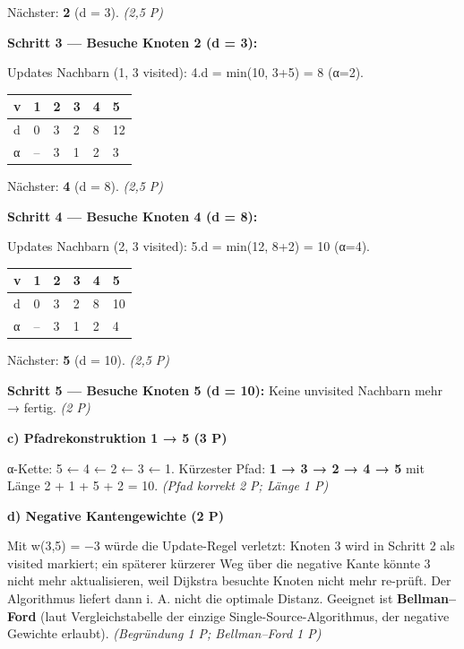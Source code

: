 \documentclass[11pt, a4paper]{article}
\begin{document}
Nächster: \textbf{2} (d = 3). \textit{(2,5 P)}


\textbf{Schritt 3 — Besuche Knoten 2 (d = 3):}

Updates Nachbarn (1, 3 visited): 4.d = min(10, 3+5) = 8 (α=2).



{\small
\begin{tabularx}{\linewidth}{XXXXXX}
\hline
\rowcolor{tableheadbg}
{\color{white}\textbf{v}} & {\color{white}\textbf{1}} & {\color{white}\textbf{2}} & {\color{white}\textbf{3}} & {\color{white}\textbf{4}} & {\color{white}\textbf{5}} \\[2pt]
\hline
\endhead
\hline
\endfoot
d & 0 & 3 & 2 & 8 & 12 \\
α & – & 3 & 1 & 2 & 3 \\
\end{tabularx}
}


Nächster: \textbf{4} (d = 8). \textit{(2,5 P)}


\textbf{Schritt 4 — Besuche Knoten 4 (d = 8):}

Updates Nachbarn (2, 3 visited): 5.d = min(12, 8+2) = 10 (α=4).



{\small
\begin{tabularx}{\linewidth}{XXXXXX}
\hline
\rowcolor{tableheadbg}
{\color{white}\textbf{v}} & {\color{white}\textbf{1}} & {\color{white}\textbf{2}} & {\color{white}\textbf{3}} & {\color{white}\textbf{4}} & {\color{white}\textbf{5}} \\[2pt]
\hline
\endhead
\hline
\endfoot
d & 0 & 3 & 2 & 8 & 10 \\
α & – & 3 & 1 & 2 & 4 \\
\end{tabularx}
}


Nächster: \textbf{5} (d = 10). \textit{(2,5 P)}


\textbf{Schritt 5 — Besuche Knoten 5 (d = 10):} Keine unvisited Nachbarn mehr → fertig. \textit{(2 P)}


\textbf{c) Pfadrekonstruktion 1 → 5 (3 P)}


α-Kette: 5 ← 4 ← 2 ← 3 ← 1. Kürzester Pfad: \textbf{1 → 3 → 2 → 4 → 5} mit Länge 2 + 1 + 5 + 2 = 10. \textit{(Pfad korrekt 2 P; Länge 1 P)}


\textbf{d) Negative Kantengewichte (2 P)}


Mit w(3,5) = −3 würde die Update-Regel verletzt: Knoten 3 wird in Schritt 2 als visited markiert; ein späterer kürzerer Weg über die negative Kante könnte 3 nicht mehr aktualisieren, weil Dijkstra besuchte Knoten nicht mehr re-prüft. Der Algorithmus liefert dann i. A. nicht die optimale Distanz. Geeignet ist \textbf{Bellman–Ford} (laut Vergleichstabelle der einzige Single-Source-Algorithmus, der negative Gewichte erlaubt). \textit{(Begründung 1 P; Bellman–Ford 1 P)}
\end{document}
